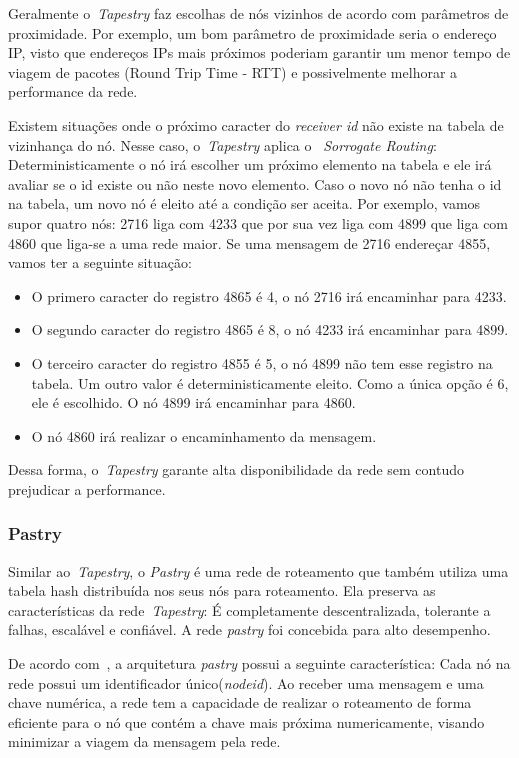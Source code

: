 Geralmente o~\emph{Tapestry} faz escolhas de nós vizinhos de acordo com parâmetros de proximidade. Por exemplo, um bom parâmetro de proximidade seria o endereço IP, visto que endereços IPs mais próximos poderiam garantir um menor tempo de viagem de pacotes (Round Trip Time - RTT) e possivelmente melhorar a performance da rede.

Existem situações onde o próximo caracter do \emph{receiver id} não existe na tabela de vizinhança do nó. Nesse caso, o~\emph{Tapestry} aplica o ~\emph{Sorrogate Routing}: Deterministicamente o nó irá escolher um próximo elemento na tabela e ele irá avaliar se o id existe ou não neste novo elemento. Caso o novo nó não tenha o id na tabela, um novo nó é eleito até a condição ser aceita. Por exemplo, vamos supor quatro nós: 2716 liga com 4233 que por sua vez liga com 4899 que liga com 4860 que liga-se a uma rede maior. Se uma mensagem de 2716 endereçar 4855, vamos ter a seguinte situação:
\begin{itemize}
	\item O primero caracter do registro 4865 é 4, o nó 2716 irá encaminhar para 4233.
	\item O segundo caracter do registro 4865 é 8, o nó 4233 irá encaminhar para 4899.
	\item O terceiro caracter do registro 4855 é 5, o nó 4899 não tem esse registro na tabela. Um outro valor é deterministicamente eleito. Como a única opção é 6, ele é escolhido. O nó 4899 irá encaminhar para 4860.
	\item O nó 4860 irá realizar o encaminhamento da mensagem.
\end{itemize}

Dessa forma, o~\emph{Tapestry} garante alta disponibilidade da rede sem contudo prejudicar a performance.

\subsubsection{Pastry}

Similar ao~\emph{Tapestry}, o \emph{Pastry} é uma rede de roteamento que também utiliza uma tabela hash distribuída nos seus nós para roteamento. Ela preserva as características da rede~\emph{Tapestry}: É completamente descentralizada, tolerante a falhas, escalável e confiável. A rede \emph{pastry} foi concebida para alto desempenho.

De acordo com~\cite{rowstron01}, a arquitetura \emph{pastry} possui a seguinte característica: Cada nó na rede possui um identificador único(\emph{nodeid}). Ao receber uma mensagem e uma chave numérica, a rede tem a capacidade de realizar o roteamento de forma eficiente para o nó que contém a chave mais próxima numericamente, visando minimizar a viagem da mensagem pela rede.

